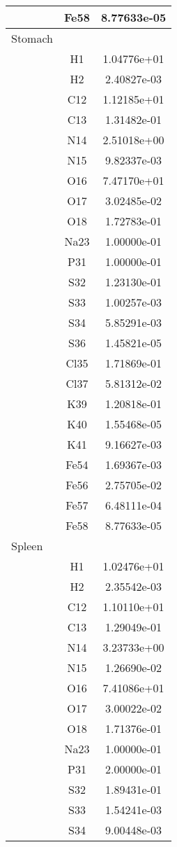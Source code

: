 \begin{centering}
\begin{longtable}{l c c}
& Fe58 & 8.77633e-05 \\ 
\hline
Stomach & & \\
\hline
& H1 & 1.04776e+01 \\ 
& H2 & 2.40827e-03 \\ 
& C12 & 1.12185e+01 \\ 
& C13 & 1.31482e-01 \\ 
& N14 & 2.51018e+00 \\ 
& N15 & 9.82337e-03 \\ 
& O16 & 7.47170e+01 \\ 
& O17 & 3.02485e-02 \\ 
& O18 & 1.72783e-01 \\ 
& Na23 & 1.00000e-01 \\ 
& P31 & 1.00000e-01 \\ 
& S32 & 1.23130e-01 \\ 
& S33 & 1.00257e-03 \\ 
& S34 & 5.85291e-03 \\ 
& S36 & 1.45821e-05 \\ 
& Cl35 & 1.71869e-01 \\ 
& Cl37 & 5.81312e-02 \\ 
& K39 & 1.20818e-01 \\ 
& K40 & 1.55468e-05 \\ 
& K41 & 9.16627e-03 \\ 
& Fe54 & 1.69367e-03 \\ 
& Fe56 & 2.75705e-02 \\ 
& Fe57 & 6.48111e-04 \\ 
& Fe58 & 8.77633e-05 \\ 
\hline
Spleen & & \\
\hline
& H1 & 1.02476e+01 \\ 
& H2 & 2.35542e-03 \\ 
& C12 & 1.10110e+01 \\ 
& C13 & 1.29049e-01 \\ 
& N14 & 3.23733e+00 \\ 
& N15 & 1.26690e-02 \\ 
& O16 & 7.41086e+01 \\ 
& O17 & 3.00022e-02 \\ 
& O18 & 1.71376e-01 \\ 
& Na23 & 1.00000e-01 \\ 
& P31 & 2.00000e-01 \\ 
& S32 & 1.89431e-01 \\ 
& S33 & 1.54241e-03 \\ 
& S34 & 9.00448e-03 \\ 

\end{longtable}
\end{centering}
